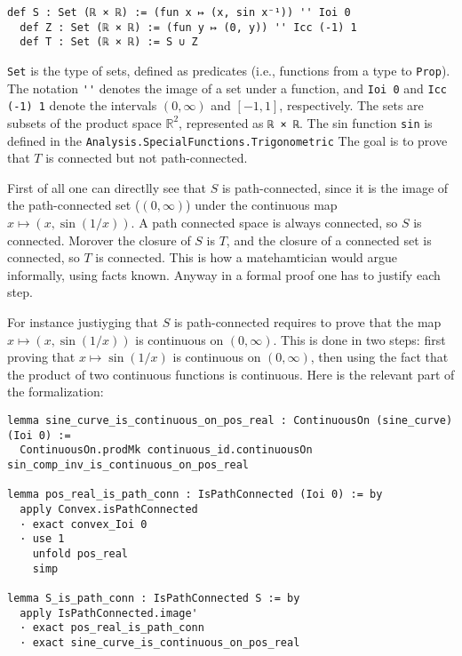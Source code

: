 \begin{lstlisting}[language=lean]
  def S : Set (ℝ × ℝ) := (fun x ↦ (x, sin x⁻¹)) '' Ioi 0
  def Z : Set (ℝ × ℝ) := (fun y ↦ (0, y)) '' Icc (-1) 1
  def T : Set (ℝ × ℝ) := S ∪ Z
\end{lstlisting}

\lstinline[language=lean]|Set| is the type of sets, defined as predicates
(i.e., functions from a type to \lstinline[language=lean]|Prop|).
The notation \lstinline[language=lean]|''| denotes the image of a set under a function,
and \lstinline[language=lean]|Ioi 0| and \lstinline[language=lean]|Icc (-1) 1|
denote the intervals $(0, \infty)$ and $[-1, 1]$, respectively.
The sets are subsets of the product space $\mathbb{R}^2$,
 represented as \lstinline[language=lean]|ℝ × ℝ|.
The sin function \lstinline[language=lean]|sin| is defined in the 
\lstinline[language=lean]|Analysis.SpecialFunctions.Trigonometric|
The goal is to prove that $T$ is connected but not path-connected.

First of all one can directlly see that  $S$ is path-connected, since it is the
image of the path-connected set ($(0, \infty)$) under the continuous map
$x \mapsto (x, \sin(1/x))$. 
A path connected space is always connected, so $S$ is connected.
Morover the closure of $S$ is $T$, and the closure of a connected set is connected,
so $T$ is connected.
This is how a matehamtician would argue informally, using facts known. 
Anyway in a formal proof one has to justify each step.

For instance justiyging that $S$ is path-connected requires to prove that the map
$x \mapsto (x, \sin(1/x))$ is continuous on $(0, \infty)$.
This is done in two steps: first proving that $x \mapsto \sin(1/x)$ is continuous on $(0, \infty)$,
then using the fact that the product of two continuous functions is continuous.
Here is the relevant part of the formalization:
\begin{lstlisting}[language=lean]
lemma sine_curve_is_continuous_on_pos_real : ContinuousOn (sine_curve) (Ioi 0) :=
  ContinuousOn.prodMk continuous_id.continuousOn sin_comp_inv_is_continuous_on_pos_real

lemma pos_real_is_path_conn : IsPathConnected (Ioi 0) := by
  apply Convex.isPathConnected
  · exact convex_Ioi 0
  · use 1
    unfold pos_real
    simp

lemma S_is_path_conn : IsPathConnected S := by
  apply IsPathConnected.image'
  · exact pos_real_is_path_conn
  · exact sine_curve_is_continuous_on_pos_real
\end{lstlisting}



